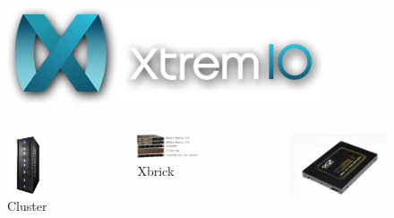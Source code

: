 \documentclass{beamer}
\theoremstyle{mystyle}
\begin{document}

\begin{frame}
\begin{figure}
	\begin{center}
		\includegraphics[scale=0.50]{xio_logo} 
	\end{center}
\end{figure}

\begin{columns}
		\begin{figure}
			\includegraphics[scale=0.5]{xio.png}
			\caption{Cluster}
		\end{figure} 
		\pause
		\begin{figure}
		 	\includegraphics[scale=0.25]{xbrick.png}
		 	\caption{Xbrick}
		\end{figure}
		\pause
		\begin{figure}
			\includegraphics[scale=0.10]{ssd.jpg}

\end{figure}
\end{columns}
\end{frame}
\end{document}
